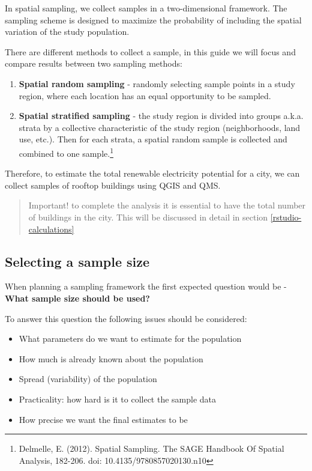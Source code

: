 \documentclass[
]{book}
\providecommand{\tightlist}{%
  \setlength{\itemsep}{0pt}\setlength{\parskip}{0pt}}
\begin{document}
In spatial sampling, we collect samples in a two-dimensional framework. The sampling scheme is designed to maximize the probability of including the spatial variation of the study population.

There are different methods to collect a sample, in this guide we will focus and compare results between two sampling methods:

\begin{enumerate}
\def\labelenumi{\arabic{enumi}.}
\tightlist
\item
  \textbf{Spatial random sampling} - randomly selecting sample points in a study region, where each location has an equal opportunity to be sampled.\\
\item
  \textbf{Spatial stratified sampling} - the study region is divided into groups a.k.a. strata by a collective characteristic of the study region (neighborhoods, land use, etc.). Then for each strata, a spatial random sample is collected and combined to one sample.\footnote{Delmelle, E. (2012). Spatial Sampling. The SAGE Handbook Of Spatial Analysis, 182-206. doi: 10.4135/9780857020130.n10}
\end{enumerate}

Therefore, to estimate the total renewable electricity potential for a city, we can collect samples of rooftop buildings using QGIS and QMS.

\begin{quote}
Important! to complete the analysis it is essential to have the total number of buildings in the city. This will be discussed in detail in section \ref{rstudio-calculations}
\end{quote}

\hypertarget{selecting-a-sample-size}{%
\subsection{Selecting a sample size}\label{selecting-a-sample-size}}

When planning a sampling framework the first expected question would be -
\textbf{What sample size should be used?}

To answer this question the following issues should be considered:

\begin{itemize}
\tightlist
\item
  What parameters do we want to estimate for the population
\item
  How much is already known about the population
\item
  Spread (variability) of the population
\item
  Practicality: how hard is it to collect the sample data
\item
  How precise we want the final estimates to be
\end{itemize}
\end{document}
